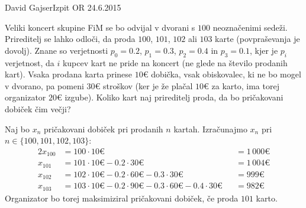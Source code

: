 \begin{naloga}{David Gajser}{Izpit OR 24.6.2015}
\begin{vprasanje}
Veliki koncert skupine FiM
se bo odvijal v dvorani s $100$ neoznačenimi sedeži.
Prireditelj se lahko odloči, da proda $100$, $101$, $102$ ali $103$ karte
(povpraševanja je dovolj).
Znane so verjetnosti $p_0 = 0.2$, $p_1 = 0.3$, $p_2 = 0.4$ in $p_3 = 0.1$,
kjer je $p_i$ verjetnost, da $i$ kupcev kart ne pride na koncert
(ne glede na število prodanih kart).
Vsaka prodana karta prinese $10 €$ dobička,
vsak obiskovalec, ki ne bo mogel v dvorano, pa pomeni $30 €$ stroškov
(ker je že plačal $10 €$ za karto, ima torej organizator $20 €$ izgube).
Koliko kart naj prireditelj proda, da bo pričakovani dobiček čim večji?
\end{vprasanje}

\begin{odgovor}
Naj bo $x_n$ pričakovani dobiček pri prodanih $n$ kartah.
Izračunajmo $x_n$ pri $n \in \{100, 101, 102, 103\}$:
\begin{alignat*}{2}
x_{100} &= 100 \cdot 10 € &&= 1\,000 € \\
x_{101} &= 101 \cdot 10 € - 0.2 \cdot 30 € &&= 1\,004 € \\
x_{102} &= 102 \cdot 10 € - 0.2 \cdot 60 € - 0.3 \cdot 30 € &&= 999 € \\
x_{103} &= 103 \cdot 10 € - 0.2 \cdot 90 € - 0.3 \cdot 60 € - 0.4 \cdot 30 €
&&= 982 €
\end{alignat*}
Organizator bo torej maksimiziral pričakovani dobiček,
če proda $101$ karto.
\end{odgovor}
\end{naloga}
